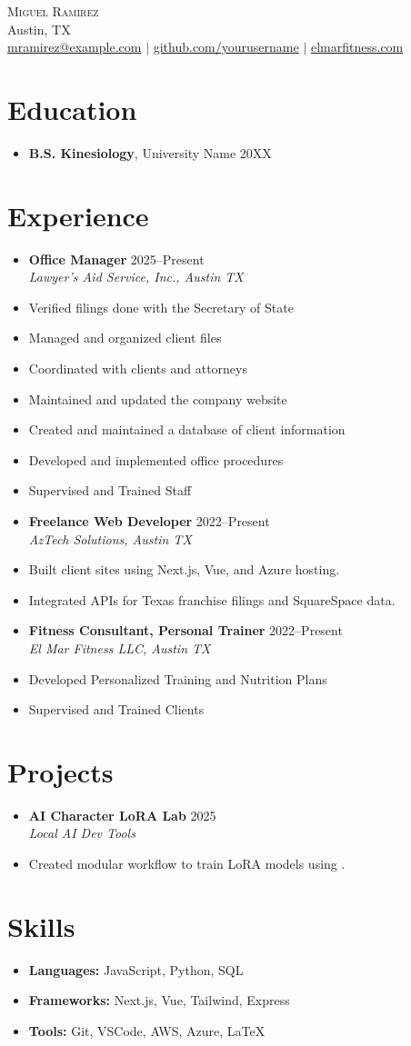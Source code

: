 \documentclass[letterpaper,10pt]{article}
\newcommand{\resumeItem}[1]{\item\small{#1}}
\newcommand{\resumeSubheading}[4]{
  \vspace{-1pt}\item
    \textbf{#1} \hfill #2 \\
    \textit{\small#3} \hfill \textit{\small #4}
}
\begin{document}
\begin{center}
  {\Huge \scshape Miguel Ramirez} \\ \vspace{1pt}
  Austin, TX \\ 
  \href{mailto:mramirez@example.com}{mramirez@example.com} $|$
  \href{https://github.com/yourusername}{github.com/yourusername} $|$
  \href{https://elmarfitness.com}{elmarfitness.com}
\end{center}

\section*{Education}
\begin{itemize}[leftmargin=0.15in]
  \item[]
    \textbf{B.S. Kinesiology}, University Name \hfill 20XX
\end{itemize}

\section*{Experience}
\begin{itemize}[leftmargin=0.15in]
  \resumeSubheading
    {Office Manager}{2025–Present}
    {Lawyer's Aid Service, Inc., Austin TX}{}
    \resumeItem{Verified filings done with the Secretary of State}
    \resumeItem{Managed and organized client files}
    \resumeItem{Coordinated with clients and attorneys}
    \resumeItem{Maintained and updated the company website}
    \resumeItem{Created and maintained a database of client information}
    \resumeItem{Developed and implemented office procedures}
    \resumeItem{Supervised and Trained Staff}
  \resumeSubheading
    {Freelance Web Developer}{2022–Present}
    {AzTech Solutions, Austin TX}{}
    \resumeItem{Built client sites using Next.js, Vue, and Azure hosting.}
    \resumeItem{Integrated APIs for Texas franchise filings and SquareSpace data.}
  \resumeSubheading
    {Fitness Consultant, Personal Trainer}{2022–Present}
    {El Mar Fitness LLC, Austin TX}{}
    \resumeItem{Developed Personalized Training and Nutrition Plans}
    \resumeItem{Supervised and Trained Clients}
\end{itemize}

\section*{Projects}
\begin{itemize}[leftmargin=0.15in]
  \resumeSubheading
    {AI Character LoRA Lab}{2025}
    {Local AI Dev Tools}{}
    \resumeItem{Created modular workflow to train LoRA models using \texttt{\detokenize{kohya_ss}}.}
\end{itemize}

\section*{Skills}
\begin{itemize}[leftmargin=0.15in, label={}]
  \item \textbf{Languages:} JavaScript, Python, SQL
  \item \textbf{Frameworks:} Next.js, Vue, Tailwind, Express
  \item \textbf{Tools:} Git, VSCode, AWS, Azure, LaTeX
\end{itemize}
\end{document}
